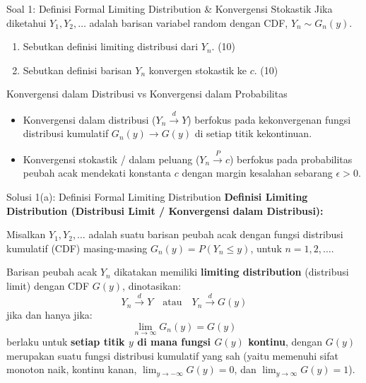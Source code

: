 \documentclass[10pt,twoside]{article}
\begin{document}
\begin{soalbox}{Soal 1: Definisi Formal Limiting Distribution \& Konvergensi Stokastik}
Jika diketahui $Y_1, Y_2, \dots$ adalah barisan variabel random dengan CDF, $Y_n \sim G_n(y)$.
\begin{enumerate}[label=(\alph*)]
  \item Sebutkan definisi limiting distribusi dari $Y_n$. (10)
  \item Sebutkan definisi barisan $Y_n$ konvergen stokastik ke $c$. (10)
\end{enumerate}
\end{soalbox}

\begin{tipbox}{Konvergensi dalam Distribusi vs Konvergensi dalam Probabilitas}
\begin{itemize}
  \item Konvergensi dalam distribusi ($Y_n \xrightarrow{d} Y$) berfokus pada kekonvergenan fungsi distribusi kumulatif $G_n(y) \to G(y)$ di setiap titik kekontinuan.
  \item Konvergensi stokastik / dalam peluang ($Y_n \xrightarrow{P} c$) berfokus pada probabilitas peubah acak mendekati konstanta $c$ dengan margin kesalahan sebarang $\epsilon > 0$.
\end{itemize}
\end{tipbox}

\begin{solbox}{Solusi 1(a): Definisi Formal Limiting Distribution}
\textbf{Definisi Limiting Distribution (Distribusi Limit / Konvergensi dalam Distribusi):}

Misalkan $Y_1, Y_2, \dots$ adalah suatu barisan peubah acak dengan fungsi distribusi kumulatif (CDF) masing-masing $G_n(y) = P(Y_n \le y)$, untuk $n = 1, 2, \dots$.

Barisan peubah acak $Y_n$ dikatakan memiliki \textbf{limiting distribution} (distribusi limit) dengan CDF $G(y)$, dinotasikan:
\[
Y_n \xrightarrow{d} Y \quad \text{atau} \quad Y_n \xrightarrow{d} G(y)
\]
jika dan hanya jika:
\[
\lim_{n \to \infty} G_n(y) = G(y)
\]
berlaku untuk \textbf{setiap titik $y$ di mana fungsi $G(y)$ kontinu}, dengan $G(y)$ merupakan suatu fungsi distribusi kumulatif yang sah (yaitu memenuhi sifat monoton naik, kontinu kanan, $\lim_{y \to -\infty} G(y) = 0$, dan $\lim_{y \to \infty} G(y) = 1$).
\end{solbox}
\end{document}
